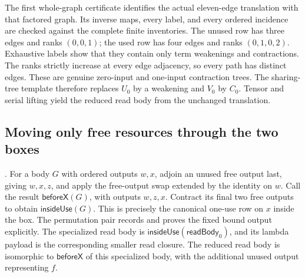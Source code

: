 The first whole-graph certificate identifies the actual eleven-edge
translation with that factored graph. Its inverse maps, every label, and
every ordered incidence are checked against the complete finite inventories.
The unused row has three edges and ranks $(0,0,1)$; the used row has four
edges and ranks $(0,1,0,2)$. Exhaustive labels show that they contain only
term weakenings and contractions. The ranks strictly increase at every
edge adjacency, so every path has distinct edges. These are genuine
zero-input and one-input contraction trees. The sharing-tree template
therefore replaces $U_0$ by a weakening and $V_0$ by $C_0$. Tensor and serial
lifting yield the reduced read body from the unchanged translation.

\subsection{Moving only free resources through the two boxes}
.
For a body $G$ with ordered outputs $w,x$, adjoin an unused free output
last, giving $w,x,z$, and apply the free-output swap extended by the identity
on $w$. Call the result $\mathsf{beforeX}(G)$, with outputs $w,z,x$.
Contract its final two free outputs to obtain $\mathsf{insideUse}(G)$.
This is precisely the canonical one-use row on $x$ inside the box.
The permutation pair records and proves the fixed bound output explicitly.
The specialized read body is $\mathsf{insideUse}(\mathsf{readBody}_0)$,
and its lambda payload is the corresponding smaller read closure.
The reduced read body is isomorphic to $\mathsf{beforeX}$ of this specialized
body, with the additional unused output representing $f$.

